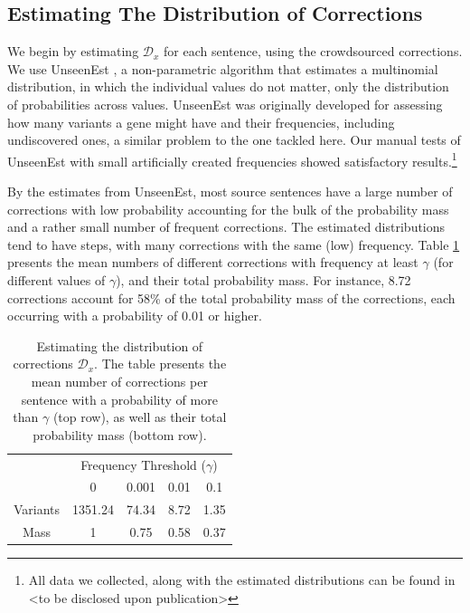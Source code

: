 \documentclass[letter,11pt]{article}
\begin{document}
\subsection{Estimating The Distribution of Corrections}\label{subsec:corrections_distribution}
%
We begin by estimating $\mathcal{D}_x$ for each sentence, using the crowdsourced corrections.
We use {\sc UnseenEst} \cite{zou2015quantifying}, a non-parametric algorithm that
estimates a multinomial distribution,
in which the individual values do not matter, only the distribution of probabilities
across values.%
 {\sc UnseenEst} was originally developed for assessing how many
variants a gene might have and their frequencies, including undiscovered ones, a similar
problem to the one tackled here.
Our manual tests of {\sc UnseenEst} with small artificially created frequencies
showed satisfactory results.\footnote{All data we collected, along with the estimated
  distributions can be found in <to be disclosed upon publication>}

By the estimates from {\sc UnseenEst}, most source sentences have a large number of
corrections with low probability accounting for the bulk of the probability mass
and a rather small number of frequent corrections.
The estimated distributions tend to have steps, with many corrections with the same (low) frequency.
Table \ref{tab:corrections_dist} presents the mean numbers of different corrections with frequency at least
$\gamma$ (for different values of $\gamma$), and their total probability mass.
For instance, 8.72 corrections account for 58\% of the total probability mass of the corrections, each
occurring with a probability of 0.01 or higher.

\begin{table}[h!]
	\vspace{-0.5cm}
  \centering
  \small
  \singlespacing
  \begin{tabular}{c|c|c|c|c|}
    & \multicolumn{4}{c|}{Frequency Threshold ($\gamma$)}\\ 
    & \multicolumn{1}{c}{0} & \multicolumn{1}{c}{0.001} & \multicolumn{1}{c}{0.01} & \multicolumn{1}{c|}{0.1}
    \\
    \hline
    Variants & 1351.24 & 74.34 & 8.72 & 1.35
    \\
    Mass & 1 & 0.75 & 0.58 & 0.37\\
    \hline
  \end{tabular}
  \caption{\label{tab:corrections_dist}
    Estimating the distribution of corrections $\mathcal{D}_x$.
    The table presents the mean number of corrections per sentence with a probability of more than
    $\gamma$ (top row), as well as their total probability mass (bottom row).
  }
  \vspace{-0.5cm}
\end{table}
%
\end{document}
